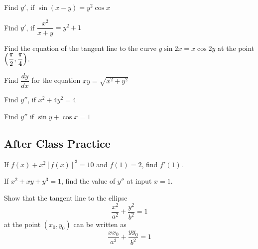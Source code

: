 \documentclass[notes]{subfiles}
\begin{document}
		\begin{ex}
			Find \(y'\), if \(\sin (x-y) = y^2\cos x\)
		\end{ex}
			
		\begin{ex}
			Find \(y'\), if \(\dfrac{x^2}{x+y} = y^2 + 1\)
		\end{ex}
			\newpage
			
			
		\begin{ex}
			Find the equation of the tangent line to the curve \(y\sin 2x = x\cos 2y\) at the point \(\left( \dfrac{\pi}{2},\dfrac{\pi}{4}\right)\).
		\end{ex}

		\begin{ex}
			Find \(\dfrac{dy}{dx}\) for the equation \(xy = \sqrt{x^2+y^2}\)
		\end{ex}
			\newpage
			
		\begin{ex}
			Find \(y''\), if \(x^2 + 4y^2 = 4\)
		\end{ex}
			
		\begin{ex}
			Find \(y''\) if \(\sin y + \cos x = 1\)
		\end{ex}
			\newpage
			
	\subsection*{After Class Practice}
		\begin{ex}
			If \(f(x) + x^2[f(x)]^3 = 10\) and \(f(1) = 2\), find \(f'(1)\).
		\end{ex}
			
		\begin{ex}
			If \(x^2 + xy + y^3 = 1\), find the value of \(y''\) at input \(x = 1\).
		\end{ex}
			\newpage
			
		\begin{ex}
			Show that the tangent line to the ellipse 
				\[\dfrac{x^2}{a^2} + \dfrac{y^2}{b^2} = 1\]
			at the point $(x_0,y_0)$ can be written as
				\[\dfrac{xx_0}{a^2} + \dfrac{yy_0}{b^2} = 1\]
		\end{ex}

	\clearpage
\end{document}
